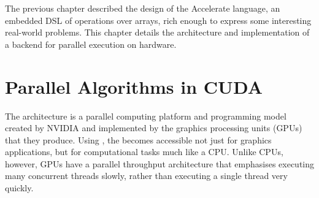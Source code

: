 

The previous chapter described the design of the Accelerate language, an
embedded DSL of operations over arrays, rich enough to express some interesting
real-world problems. This chapter details the architecture and implementation of
a backend for parallel execution on \CUDA hardware.


\section{Parallel Algorithms in CUDA}

The \CUDA architecture is a parallel computing platform and programming model
created by NVIDIA and implemented by the graphics processing units
(GPUs)
that they produce. Using \CUDA, the \GPU becomes accessible not just for
graphics applications, but for computational tasks much like a CPU\@. Unlike
CPUs, however, GPUs have a parallel throughput architecture that emphasises
executing many concurrent threads slowly, rather than executing a single thread
very quickly.

